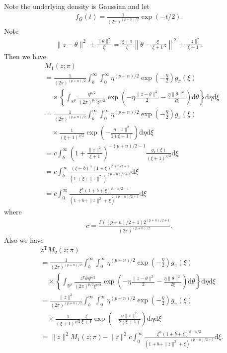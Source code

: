 \documentclass[preprint,11pt]{imsart}
\numberwithin{equation}{section}
\theoremstyle{plain}
\theoremstyle{definition}
\theoremstyle{remark}
\def\T{{ \mathrm{\scriptscriptstyle T} }}
\newcommand{\rd}{\mathrm{d}}
\begin{document}
Note the underlying density is Gaussian and let
\begin{align*}
 f_G(t)=\frac{1}{(2\pi)^{(p+n)/2}}\exp(-t/2).
\end{align*}
Note
\begin{align*}
 \|z-\theta\|^2+\frac{\|\theta\|^2}{\xi}=\frac{\xi+1}{\xi}\left\|\theta -\frac{\xi}{\xi+1}z\right\|^2
 +\frac{\|z\|^2}{\xi+1}.
\end{align*}
Then we have
\begin{align*}
 & M_1(z;\pi)\\
 &=\frac{1}{(2\pi)^{(p+n)/2}}
 \int_b^\infty\int_0^\infty\eta^{(p+n)/2}\exp\left(-\frac{\eta}{2}\right)g_\pi(\xi) \\ &\quad\times  \left\{\int_{\mathbb{R}^p}
 \frac{\eta^{p/2}}{(2\pi)^{p/2}\xi^{p/2}}
 \exp\left(-\eta\frac{\|z-\theta\|^2}{2}-\frac{\eta\|\theta\|^2}{2\xi}\right)\rd\theta\right\}\rd \eta \rd\xi\\
 &=\frac{1}{(2\pi)^{(p+n)/2}}
 \int_b^\infty\int_0^\infty\eta^{(p+n)/2}\exp\left(-\frac{\eta}{2}\right)g_\pi(\xi) \\ &\quad\times
\frac{1}{(\xi+1)^{p/2}}\exp\left(-\frac{\eta\|z\|^2}{2(\xi+1)}\right)
\rd \eta\rd\xi \\
 &=c
 \int_b^\infty
\left(1+\frac{\|z\|^2}{\xi+1}\right)^{-(p+n)/2-1}
\frac{g_\pi(\xi) }{(\xi+1)^{p/2}}\rd\xi \\
 &=c
 \int_b^\infty\frac{(\xi-b)^\alpha(1+\xi)^{\beta+n/2+1}}{(1+\xi+\|z\|^2)^{(p+n)/2+1}}
\rd\xi \\
 &=c
 \int_0^\infty\frac{\xi^\alpha(1+b+\xi)^{\beta+n/2+1}}{(1+b+\|z\|^2+\xi)^{(p+n)/2+1}}
\rd\xi 
\end{align*}
where
\begin{align*}
 c=\frac{\Gamma((p+n)/2+1)2^{(p+n)/2+1}}{(2\pi)^{(p+n)/2}}.
\end{align*}
Also we have
\begin{align*}
 & z^\T M_2(z;\pi)\\
 &=\frac{1}{(2\pi)^{(p+n)/2}}
 \int_b^\infty\int_0^\infty\eta^{(p+n)/2}\exp\left(-\frac{\eta}{2}\right)g_\pi(\xi) \\ &\quad\times  \left\{\int_{\mathbb{R}^p}
 \frac{z^\T\theta\eta^{p/2}}{(2\pi)^{p/2}\xi^{p/2}}
 \exp\left(-\eta\frac{\|z-\theta\|^2}{2}-\frac{\eta\|\theta\|^2}{2\xi}\right)\rd\theta\right\}\rd \eta \rd\xi\\
 &=\frac{\|z\|^2}{(2\pi)^{(p+n)/2}}
 \int_b^\infty\int_0^\infty\eta^{(p+n)/2}\exp\left(-\frac{\eta}{2}\right)g_\pi(\xi) \\ &\quad\times
\frac{1}{(\xi+1)^{p/2}}\frac{\xi}{\xi+1}\exp\left(-\frac{\eta\|z\|^2}{2(\xi+1)}\right)
 \rd \eta\rd\xi \\
 &=\|z\|^2M_1(z;\pi)-\|z\|^2
c \int_0^\infty\frac{\xi^\alpha(1+b+\xi)^{\beta+n/2}}{(1+b+\|z\|^2+\xi)^{(p+n)/2+1}}
\rd\xi .
\end{align*}
\end{document}
